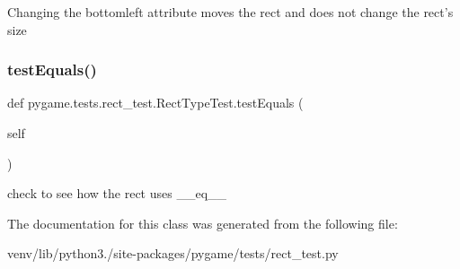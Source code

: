 \begin{DoxyVerb}Changing the bottomleft attribute moves the rect and does not change
   the rect's size
\end{DoxyVerb}
 \mbox{\label{classpygame_1_1tests_1_1rect__test_1_1_rect_type_test_a80466c489b8bf488b31f21f3690f8429}} 
\subsubsection{\texorpdfstring{test\+Equals()}{testEquals()}}
{\footnotesize\ttfamily def pygame.\+tests.\+rect\+\_\+test.\+Rect\+Type\+Test.\+test\+Equals (\begin{DoxyParamCaption}\item[{}]{self }\end{DoxyParamCaption})}

\begin{DoxyVerb}check to see how the rect uses __eq__ 
\end{DoxyVerb}
 

The documentation for this class was generated from the following file\+:\begin{DoxyCompactItemize}
\item 
venv/lib/python3./site-\/packages/pygame/tests/rect\+\_\+test.\+py\end{DoxyCompactItemize}
